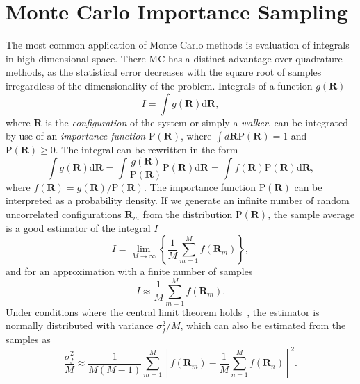 \section{Monte Carlo Importance Sampling}
\label{sec:Impl-MCIP}
The most common application of Monte Carlo methods is evaluation of integrals in high dimensional space. There MC has a distinct advantage over quadrature methods, as the statistical error decreases with the square root of samples irregardless of the dimensionality of the problem. Integrals of a function $g(\mathbf{R})$
\begin{equation}
I=\int g(\mathbf{R}) \mathrm{d} \mathbf{R},
\end{equation}
where $\mathbf{R}$ is the \emph{configuration} of the system or simply a \emph{walker}, can be integrated by use of an \emph{importance function} $\mathrm{P}(\mathbf{R})$, where $\int d \mathbf{R} \text{P}(\mathbf{R})=1$ and $\mathrm{P} (\mathbf{R}) \geq 0$. The integral can be rewritten in the form
\begin{equation}
\int g(\mathbf{R}) \mathrm{d} \mathbf{R} = \int \frac{g(\mathbf{R})}{\mathrm{P}(\mathbf{R})} \mathrm{P}(\mathbf{R}) \mathrm{d} \mathbf{R} = \int f(\mathbf{R})\mathrm{P}(\mathbf{R}) \mathrm{d} \mathbf{R},
\end{equation}
where $f(\mathbf{R}) = g(\mathbf{R}) / \mathrm{P}(\mathbf{R})$.
The importance function $\mathrm{P}(\mathbf{R})$ can be interpreted as a probability density. If we generate an infinite number of random uncorrelated configurations $\mathbf{R}_m$ from the distribution $\mathrm{P}(\mathbf{R})$, the sample average is a good estimator of the integral $I$
\begin{equation}
I=\lim _{M \rightarrow \infty}\left\{\frac{1}{M} \sum_{m=1}^{M} f\left(\mathbf{R}_{m}\right)\right\},
\end{equation}
and for an approximation with a finite number of samples
\begin{equation}
I \approx \frac{1}{M} \sum_{m=1}^{M} f\left(\mathbf{R}_{m}\right).
\end{equation}
Under conditions where the central limit theorem holds~\cite{foulkes2001quantum}, the estimator is normally distributed with variance $\sigma_{f}^{2}/M$, which can also be estimated from the samples as
\begin{equation}
\frac{\sigma_{f}^{2}}{M} \approx \frac{1}{M(M-1)} \sum_{m=1}^{M}\left[f\left(\mathbf{R}_{m}\right)-\frac{1}{M} \sum_{n=1}^{M} f\left(\mathbf{R}_{n}\right)\right]^{2}.
\end{equation}

